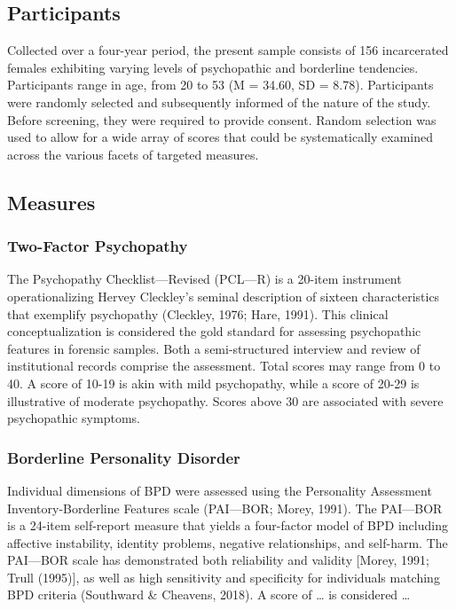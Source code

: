 \documentclass[
  man,floatsintext]{apa7}
\begin{document}
\hypertarget{participants}{%
\subsection{Participants}\label{participants}}

Collected over a four-year period, the present sample consists of 156 incarcerated females exhibiting varying levels of psychopathic and borderline tendencies. Participants range in age, from 20 to 53 (M = 34.60, SD = 8.78). Participants were randomly selected and subsequently informed of the nature of the study. Before screening, they were required to provide consent. Random selection was used to allow for a wide array of scores that could be systematically examined across the various facets of targeted measures.

\hypertarget{measures}{%
\subsection{Measures}\label{measures}}

\hypertarget{two-factor-psychopathy}{%
\subsubsection{Two-Factor Psychopathy}\label{two-factor-psychopathy}}

The Psychopathy Checklist---Revised (PCL---R) is a 20-item instrument operationalizing Hervey Cleckley's seminal description of sixteen characteristics that exemplify psychopathy (Cleckley, 1976; Hare, 1991). This clinical conceptualization is considered the gold standard for assessing psychopathic features in forensic samples. Both a semi-structured interview and review of institutional records comprise the assessment. Total scores may range from 0 to 40. A score of 10-19 is akin with mild psychopathy, while a score of 20-29 is illustrative of moderate psychopathy. Scores above 30 are associated with severe psychopathic symptoms.

\hypertarget{borderline-personality-disorder}{%
\subsubsection{Borderline Personality Disorder}\label{borderline-personality-disorder}}

Individual dimensions of BPD were assessed using the Personality Assessment Inventory-Borderline Features scale (PAI---BOR; Morey, 1991). The PAI---BOR is a 24-item self-report measure that yields a four-factor model of BPD including affective instability, identity problems, negative relationships, and self-harm. The PAI---BOR scale has demonstrated both reliability and validity {[}Morey, 1991; Trull (1995){]}, as well as high sensitivity and specificity for individuals matching BPD criteria (Southward \& Cheavens, 2018). A score of \ldots{} is considered \ldots{}
\end{document}
